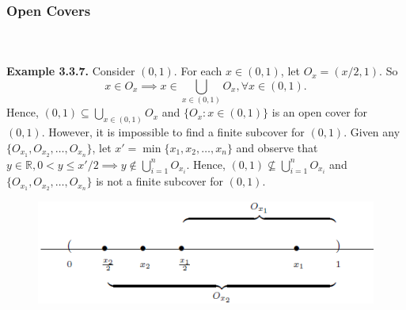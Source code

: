 \documentclass{article}
\begin{document}
            \subsubsection{Open Covers}
            \\ \\
            \textbf{Example 3.3.7.} Consider $(0,1)$. For each $x \in (0,1)$, let $O_x = (x/2,1)$. So 
            \begin{equation*}
                x \in O_x \implies x \in \bigcup_{x \in (0,1)} O_x, \forall x \in (0,1).
            \end{equation*}
            Hence, $(0,1) \subseteq \bigcup_{x \in (0,1)} O_x$ and $\{O_x: x \in (0,1)\}$ is an open cover for $(0,1)$. However, it is impossible to find a finite subcover for $(0,1)$. Given any $\{O_{x_1},O_{x_2},\dots,O_{x_n}\}$, let $x' = \min \{x_1,x_2,\dots,x_n\}$ and observe that $y \in \mathbb{R}, 0 < y \leq x'/2 \implies y \notin \bigcup_{i=1}^n O_{x_i}$. Hence, $(0,1) \nsubseteq \bigcup_{i=1}^n O_{x_i}$ and $\{O_{x_1},O_{x_2},\dots,O_{x_n}\}$ is not a finite subcover for $(0,1)$.
            
            \begin{figure}[ht!]
                \centering
                \includegraphics[width=0.8\linewidth]{figs/example3.3.7.png}
                \caption{}
            \end{figure}
            
\end{document}
